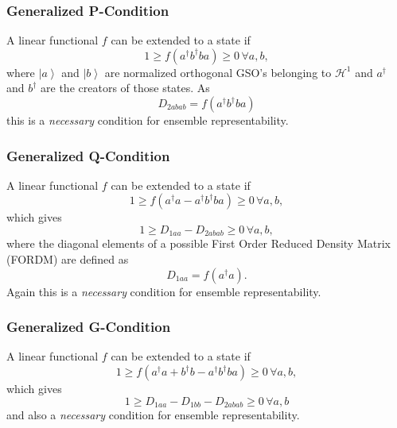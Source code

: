\documentclass[aps,preprint]{revtex4}%
\begin{document}
\subsubsection{Generalized P-Condition}

A linear functional $f$ can be extended to a state if
\begin{equation}
1\geq f\left(  a^{\dagger}b^{\dagger}ba\right)  \geq0\,\forall a,b,
\end{equation}
where $\left\vert a\right\rangle $ and $\left\vert b\right\rangle $ are
normalized orthogonal GSO's belonging to $\mathcal{H}^{1}$ and $a^{\dagger}$
and $b^{\dagger}$ are the creators of those states. As
\begin{equation}
D_{2abab}=f\left(  a^{\dagger}b^{\dagger}ba\right)
\end{equation}
this is a \emph{necessary }condition for ensemble representability.

\subsubsection{Generalized Q-Condition}

A linear functional $f$ can be extended to a state if
\begin{equation}
1\geq f\left(  a^{\dagger}a-a^{\dagger}b^{\dagger}ba\right)  \geq0\,\forall
a,b,
\end{equation}
which gives
\begin{equation}
1\geq D_{1aa}-D_{2abab}\geq0\,\forall a,b, \label{Q1}%
\end{equation}
where the diagonal elements of a possible First Order Reduced Density Matrix
(FORDM) are defined as
\begin{equation}
D_{1aa}=f\left(  a^{\dagger}a\right)  .
\end{equation}
Again this is a \emph{necessary }condition for ensemble representability.

\subsubsection{Generalized G-Condition}

A linear functional $f$ can be extended to a state if
\begin{equation}
1\geq f\left(  a^{\dagger}a+b^{\dagger}b-a^{\dagger}b^{\dagger}ba\right)
\geq0\,\forall a,b,
\end{equation}
which gives
\begin{equation}
1\geq D_{1aa}-D_{1bb}-D_{2abab}\geq0\,\forall a,b \label{G1}%
\end{equation}
and also a \emph{necessary }condition for ensemble representability.
\end{document}
